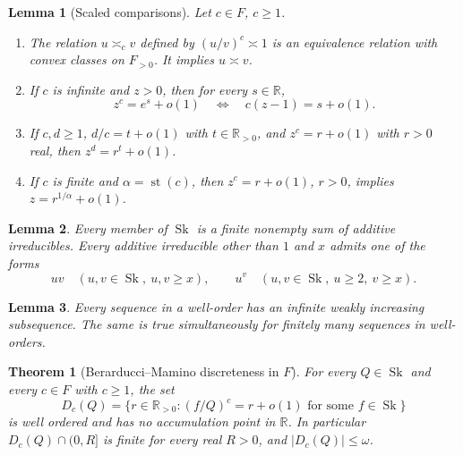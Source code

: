 \documentclass[10pt,a4paper]{amsart}
\newtheorem{lemma}{Lemma}
\newtheorem{theorem}{Theorem}
\newcommand{\R}{\mathbb R}
\newcommand{\Sk}{\operatorname{Sk}}
\newcommand{\arch}{\mathrel{\asymp}}
\newcommand{\st}{\operatorname{st}}
\begin{document}
\begin{lemma}[Scaled comparisons]\label{sf:lem:scaled}
Let $c\in F$, $c\ge1$.
\begin{enumerate}[label=\textup{(\roman*)},leftmargin=2.5em]
\item The relation $u\arch_c v$ defined by $(u/v)^c\arch1$ is
an equivalence relation with convex classes on $F_{>0}$. It implies
$u\arch v$.
\item If $c$ is infinite and $z>0$, then for every $s\in\R$,
\[
 z^c=e^s+o(1)\quad\Longleftrightarrow\quad
 c(z-1)=s+o(1).
\]
\item If $c,d\ge1$, $d/c=t+o(1)$ with $t\in\R_{>0}$, and
$z^c=r+o(1)$ with $r>0$ real, then $z^d=r^t+o(1)$.
\item If $c$ is finite and $\alpha=\st(c)$, then
$z^c=r+o(1)$, $r>0$, implies $z=r^{1/\alpha}+o(1)$.
\end{enumerate}
\end{lemma}

\begin{lemma}\label{sf:lem:atoms}
Every member of $\Sk$ is a finite nonempty sum of additive irreducibles.
Every additive irreducible other than $1$ and $x$ admits one of the forms
\[
 uv\quad(u,v\in\Sk,\ u,v\ge x),\qquad
 u^v\quad(u,v\in\Sk,\ u\ge2,\ v\ge x).
\]
\end{lemma}

\begin{lemma}\label{sf:lem:subsequence}
Every sequence in a well-order has an infinite weakly increasing
subsequence. The same is true simultaneously for finitely many
sequences in well-orders.
\end{lemma}

\begin{theorem}[Berarducci--Mamino discreteness in $F$]\label{sf:thm:discrete}
For every $Q\in\Sk$ and every $c\in F$ with $c\ge1$, the set
\[
 D_c(Q)=\{r\in\R_{>0}:(f/Q)^c=r+o(1)
                         \text{ for some }f\in\Sk\}
\]
is well ordered and has no accumulation point in $\R$.
In particular $D_c(Q)\cap(0,R]$ is finite for every real $R>0$,
and $|D_c(Q)|\le\omega$.
\end{theorem}
\end{document}
